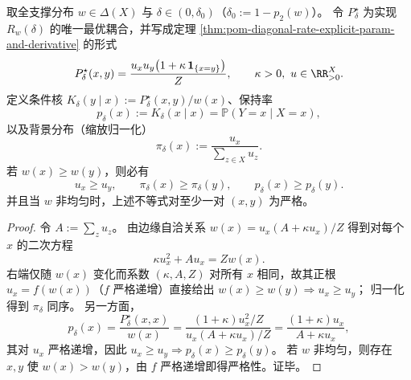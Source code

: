 





\begin{proposition}[最优缩放与保持率的同序性]\label{prop:pom-diagonal-rate-scaling-keep-comonotone}
取全支撑分布 \(w\in\Delta(X)\) 与 \(\delta\in(0,\delta_0)\)（\(\delta_0:=1-p_2(w)\)）。
令 \(P^\star_\delta\) 为实现 \(R_w(\delta)\) 的唯一最优耦合，并写成定理 \ref{thm:pom-diagonal-rate-explicit-param-and-derivative} 的形式
\[
P^\star_\delta(x,y)=\frac{u_xu_y\bigl(1+\kappa\,\mathbf 1_{\{x=y\}}\bigr)}{Z},
\qquad
\kappa>0,\ u\in\RR_{>0}^X.
\]
定义条件核 \(K_\delta(y\mid x):=P^\star_\delta(x,y)/w(x)\)、保持率
\[
p_\delta(x):=K_\delta(x\mid x)=\mathbb P(Y=x\mid X=x),
\]
以及背景分布（缩放归一化）
\[
\pi_\delta(x):=\frac{u_x}{\sum_{z\in X}u_z}.
\]
若 \(w(x)\ge w(y)\)，则必有
\[
u_x\ge u_y,\qquad \pi_\delta(x)\ge \pi_\delta(y),\qquad p_\delta(x)\ge p_\delta(y).
\]
并且当 \(w\) 非均匀时，上述不等式对至少一对 \((x,y)\) 为严格。
\end{proposition}
\begin{proof}
令 \(A:=\sum_z u_z\)。
由边缘自洽关系 \(w(x)=u_x(A+\kappa u_x)/Z\) 得到对每个 \(x\) 的二次方程
\[
\kappa u_x^2+A u_x=Zw(x).
\]
右端仅随 \(w(x)\) 变化而系数 \((\kappa,A,Z)\) 对所有 \(x\) 相同，故其正根 \(u_x=f(w(x))\)（\(f\) 严格递增）直接给出 \(w(x)\ge w(y)\Rightarrow u_x\ge u_y\)；
归一化得到 \(\pi_\delta\) 同序。
另一方面，
\[
p_\delta(x)
=\frac{P^\star_\delta(x,x)}{w(x)}
=\frac{(1+\kappa)u_x^2/Z}{u_x(A+\kappa u_x)/Z}
=\frac{(1+\kappa)u_x}{A+\kappa u_x},
\]
其对 \(u_x\) 严格递增，因此 \(u_x\ge u_y\Rightarrow p_\delta(x)\ge p_\delta(y)\)。
若 \(w\) 非均匀，则存在 \(x,y\) 使 \(w(x)>w(y)\)，由 \(f\) 严格递增即得严格性。证毕。
\end{proof}

